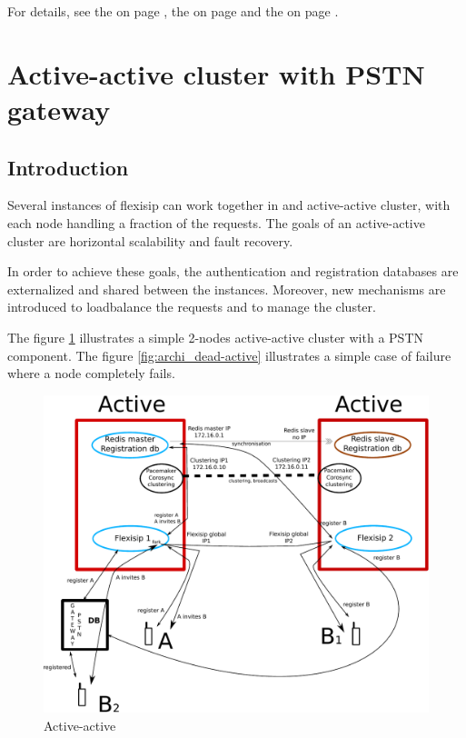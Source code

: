 \documentclass[a4paper,10pt]{article}
\begin{document}
For details, see the  on page \pageref{module::Registrar},
the  on page \pageref{module::Authentication}
and the  on page \pageref{module::GatewayAdapter}.



\section{Active-active cluster with PSTN gateway}

\subsection{Introduction}
Several instances of flexisip can work together in and active-active cluster, with each node handling a fraction of the requests.
The goals of an active-active cluster are horizontal scalability and fault recovery.

In order to achieve these goals, the authentication and registration databases are externalized and shared between the instances.
Moreover, new mechanisms are introduced to loadbalance the requests and to manage the cluster.



The figure \ref{fig:archi_active-active} illustrates a simple 2-nodes active-active cluster with a PSTN component.
The figure \ref{fig:archi_dead-active} illustrates a simple case of failure where a node completely fails.


\begin{figure}[ht!]
 \centering
 \includegraphics[keepaspectratio=true, scale=0.7]{./schema_archi_flexisip_active-active.pdf}
 \caption{Active-active}
 \label{fig:archi_active-active}
\end{figure}
\end{document}
